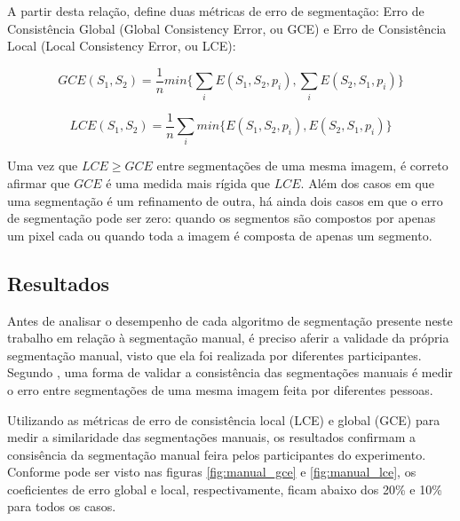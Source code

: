 A partir desta relação,  define duas métricas de erro de segmentação: Erro de Consistência Global (Global Consistency Error, ou GCE) e Erro de Consistência Local (Local Consistency Error, ou LCE):

\begin{equation}
	GCE(S_1,S_2) = \frac{1}{n} min \biggl\{ \sum_{i} E(S_1,S_2,p_i), \sum_{i} E(S_2,S_1,p_i) \biggr\}
\end{equation}

\begin{equation}
	LCE(S_1,S_2) = \frac{1}{n} \sum_{i} min \biggl\{ E(S_1,S_2,p_i), E(S_2,S_1,p_i) \biggr\}
\end{equation}

Uma vez que $LCE \geq GCE$ entre segmentações de uma mesma imagem, é correto afirmar que $GCE$ é uma medida mais rígida que $LCE$. Além dos casos em que uma segmentação é um refinamento de outra, há ainda dois casos em que o erro de segmentação pode ser zero: quando os segmentos são compostos por apenas um pixel cada ou quando toda a imagem é composta de apenas um segmento.

\subsection{Resultados}

Antes de analisar o desempenho de cada algoritmo de segmentação presente neste trabalho em relação à segmentação manual, é preciso aferir a validade da própria segmentação manual, visto que ela foi realizada por diferentes participantes. Segundo , uma forma de validar a consistência das segmentações manuais é medir o erro entre segmentações de uma mesma imagem feita por diferentes pessoas.

Utilizando as métricas de erro de consistência local (LCE) e global (GCE) para medir a similaridade das segmentações manuais, os resultados confirmam a consisência da segmentação manual feira pelos participantes do experimento. Conforme pode ser visto nas figuras \ref{fig:manual_gce} e \ref{fig:manual_lce}, os coeficientes de erro global e local, respectivamente, ficam abaixo dos 20\% e 10\% para todos os casos.


